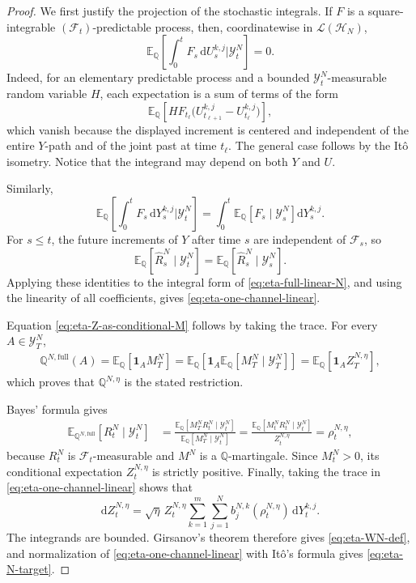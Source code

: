 \documentclass[10pt,a4paper,reqno]{amsart}
\numberwithin{equation}{section}
\theoremstyle{plain}
\theoremstyle{definition}
\theoremstyle{remark}
\renewcommand{\d}{\mathrm d}
\newcommand{\E}{\mathbb E}
\newcommand{\Q}{\mathbb Q}
\newcommand{\cL}{\mathcal L}
\newcommand{\cF}{\mathcal F}
\newcommand{\cY}{\mathcal Y}
\newcommand{\HH}{\mathcal H}
\newcommand{\1}{\mathbf 1}
\begin{document}
\begin{proof}
We first justify the projection of the stochastic integrals.  If \(F\) is a
square-integrable \((\cF_t)\)-predictable process, then, coordinatewise in
\(\cL(\HH_N)\),
\begin{equation}
  \E_{\Q}
  \left[
    \int_0^t F_s\,\d U_s^{k,j}
    \mathrel{\bigg|}
    \cY_t^N
  \right]
  =0.
  \label{eq:eta-U-projection}
\end{equation}
Indeed, for an elementary predictable process and a bounded
\(\cY_t^N\)-measurable random variable \(H\), each expectation is a sum of
terms of the form
\[
  \E_{\Q}
  \left[
    H F_{t_\ell}
    \bigl(
      U_{t_{\ell+1}}^{k,j}-U_{t_\ell}^{k,j}
    \bigr)
  \right],
\]
which vanish because the displayed increment is centered and independent of
the entire \(Y\)-path and of the joint past at time \(t_\ell\).  The general
case follows by the It\^o isometry.  Notice that the integrand may depend on
both \(Y\) and \(U\).

Similarly,
\begin{equation}
  \E_{\Q}
  \left[
    \int_0^t F_s\,\d Y_s^{k,j}
    \mathrel{\bigg|}
    \cY_t^N
  \right]
  =
  \int_0^t
  \E_{\Q}
  \left[
    F_s\mid\cY_s^N
  \right]\d Y_s^{k,j}.
  \label{eq:eta-Y-projection}
\end{equation}
For \(s\le t\), the future increments of \(Y\) after time \(s\) are
independent of \(\cF_s\), so
\[
  \E_{\Q}
  \left[
    \widehat R_s^N\mid\cY_t^N
  \right]
  =
  \E_{\Q}
  \left[
    \widehat R_s^N\mid\cY_s^N
  \right].
\]
Applying these identities to the integral form of
\eqref{eq:eta-full-linear-N}, and using the linearity of all coefficients,
gives \eqref{eq:eta-one-channel-linear}.

Equation \eqref{eq:eta-Z-as-conditional-M} follows by taking the trace.  For
every \(A\in\cY_T^N\),
\[
\begin{aligned}
  \Q^{N,\mathrm{full}}(A)
  =
  \E_{\Q}[\1_A M_T^N]
  =
  \E_{\Q}
  \left[
    \1_A
    \E_{\Q}[M_T^N\mid\cY_T^N]
  \right]
  =
  \E_{\Q}[\1_A Z_T^{N,\eta}],
\end{aligned}
\]
which proves that \(\Q^{N,\eta}\) is the stated restriction.

Bayes' formula gives
\[
\begin{aligned}
  \E_{\Q^{N,\mathrm{full}}}
  \left[
    R_t^N\mid\cY_t^N
  \right]
  &=
  \frac{
    \E_{\Q}
    \left[
      M_T^N R_t^N\mid\cY_t^N
    \right]
  }{
    \E_{\Q}
    \left[
      M_T^N\mid\cY_t^N
    \right]
  }
  =
  \frac{
    \E_{\Q}
    \left[
      M_t^N R_t^N\mid\cY_t^N
    \right]
  }{Z_t^{N,\eta}}
  =
  \rho_t^{N,\eta},
\end{aligned}
\]
because \(R_t^N\) is \(\cF_t\)-measurable and \(M^N\) is a
\(\Q\)-martingale.  Since \(M_t^N>0\), its conditional expectation
\(Z_t^{N,\eta}\) is strictly positive.  Finally, taking the trace in
\eqref{eq:eta-one-channel-linear} shows that
\[
  \d Z_t^{N,\eta}
  =
  \sqrt{\eta}\,Z_t^{N,\eta}
  \sum_{k=1}^m\sum_{j=1}^N
  b_j^{N,k}(\rho_t^{N,\eta})\,\d Y_t^{k,j}.
\]
The integrands are bounded.  Girsanov's theorem therefore gives
\eqref{eq:eta-WN-def}, and normalization of
\eqref{eq:eta-one-channel-linear} with Itô's formula gives \eqref{eq:eta-N-target}.
\end{proof}
\end{document}
